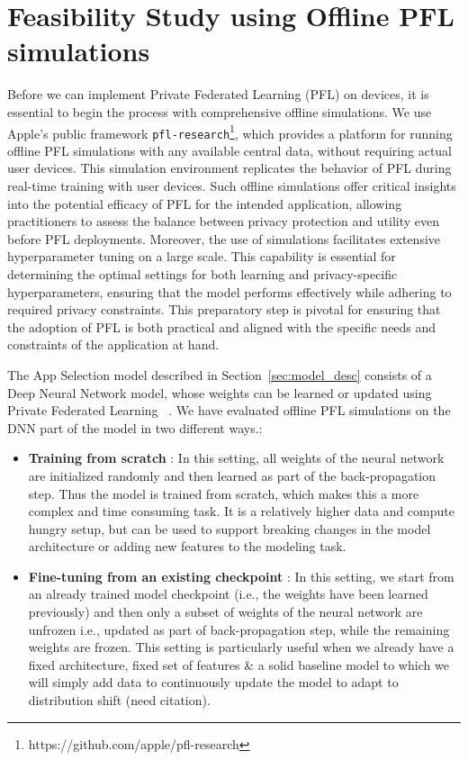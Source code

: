 \section{Feasibility Study using Offline PFL simulations}

Before we can implement Private Federated Learning (PFL) on devices, it is essential to begin the process with comprehensive offline simulations. We use Apple's public framework \texttt{pfl-research}\footnote{https://github.com/apple/pfl-research}, which provides a platform for running offline PFL simulations with any available central data, without requiring actual user devices. This simulation environment replicates the behavior of PFL during real-time training with user devices.  Such offline simulations offer critical insights into the potential efficacy of PFL for the intended application, allowing practitioners to assess the balance between privacy protection and utility even before PFL deployments. Moreover, the use of simulations facilitates extensive hyperparameter tuning on a large scale. This capability is essential for determining the optimal settings for both learning and privacy-specific hyperparameters, ensuring that the model performs effectively while adhering to required privacy constraints. This preparatory step is pivotal for ensuring that the adoption of PFL is both practical and aligned with the specific needs and constraints of the application at hand.

The App Selection model described in Section~\ref{sec:model_desc} consists of a Deep Neural Network model, whose weights can be learned or updated using Private Federated Learning~\cite{reddi2020adaptive} . We have evaluated offline PFL simulations on the DNN part of the model in two different ways.:
\begin{itemize}
    \item \textbf{Training from scratch} : In this setting, all weights of the neural network are initialized randomly and then learned as part of the back-propagation step. Thus the model is trained from scratch, which makes this a more complex and time consuming task. It is a relatively higher data and compute hungry setup, but can be used to support breaking changes in the model architecture or adding new features to the modeling task. 
    \item \textbf{Fine-tuning from an existing checkpoint} : In this setting, we start from an already trained model checkpoint (i.e., the weights have been learned previously) and then only a subset of weights of the neural network are unfrozen i.e., updated as part of back-propagation step, while the remaining weights are frozen. This setting is particularly useful when we already have a fixed architecture, fixed set of features \& a solid baseline model to which we will simply add data to continuously update the model to adapt to distribution shift (need citation).
\end{itemize}


